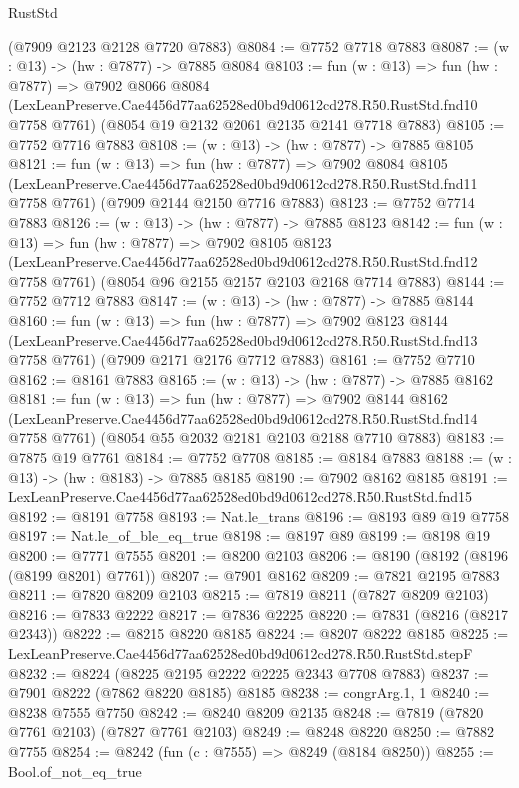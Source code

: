 \begin{lexlean}{RustStd}
\begin{coremodule}
    (@7909 @2123 @2128 @7720 @7883)
@8084 := @7752 @7718 @7883
@8087 := (w : @13) -> (hw : @7877) -> @7885 @8084
@8103 := fun (w : @13) =>
  fun (hw : @7877) =>
  @7902
    @8066
    @8084
    (LexLeanPreserve.Cae4456d77aa62528ed0bd9d0612cd278.R50.RustStd.fnd10 @7758 @7761)
    (@8054 @19 @2132 @2061 @2135 @2141 @7718 @7883)
@8105 := @7752 @7716 @7883
@8108 := (w : @13) -> (hw : @7877) -> @7885 @8105
@8121 := fun (w : @13) =>
  fun (hw : @7877) =>
  @7902
    @8084
    @8105
    (LexLeanPreserve.Cae4456d77aa62528ed0bd9d0612cd278.R50.RustStd.fnd11 @7758 @7761)
    (@7909 @2144 @2150 @7716 @7883)
@8123 := @7752 @7714 @7883
@8126 := (w : @13) -> (hw : @7877) -> @7885 @8123
@8142 := fun (w : @13) =>
  fun (hw : @7877) =>
  @7902
    @8105
    @8123
    (LexLeanPreserve.Cae4456d77aa62528ed0bd9d0612cd278.R50.RustStd.fnd12 @7758 @7761)
    (@8054 @96 @2155 @2157 @2103 @2168 @7714 @7883)
@8144 := @7752 @7712 @7883
@8147 := (w : @13) -> (hw : @7877) -> @7885 @8144
@8160 := fun (w : @13) =>
  fun (hw : @7877) =>
  @7902
    @8123
    @8144
    (LexLeanPreserve.Cae4456d77aa62528ed0bd9d0612cd278.R50.RustStd.fnd13 @7758 @7761)
    (@7909 @2171 @2176 @7712 @7883)
@8161 := @7752 @7710
@8162 := @8161 @7883
@8165 := (w : @13) -> (hw : @7877) -> @7885 @8162
@8181 := fun (w : @13) =>
  fun (hw : @7877) =>
  @7902
    @8144
    @8162
    (LexLeanPreserve.Cae4456d77aa62528ed0bd9d0612cd278.R50.RustStd.fnd14 @7758 @7761)
    (@8054 @55 @2032 @2181 @2103 @2188 @7710 @7883)
@8183 := @7875 @19 @7761
@8184 := @7752 @7708
@8185 := @8184 @7883
@8188 := (w : @13) -> (hw : @8183) -> @7885 @8185
@8190 := @7902 @8162 @8185
@8191 := LexLeanPreserve.Cae4456d77aa62528ed0bd9d0612cd278.R50.RustStd.fnd15
@8192 := @8191 @7758
@8193 := Nat.le_trans
@8196 := @8193 @89 @19 @7758
@8197 := Nat.le_of_ble_eq_true
@8198 := @8197 @89
@8199 := @8198 @19
@8200 := @7771 @7555
@8201 := @8200 @2103
@8206 := @8190 (@8192 (@8196 (@8199 @8201) @7761))
@8207 := @7901 @8162
@8209 := @7821 @2195 @7883
@8211 := @7820 @8209 @2103
@8215 := @7819 @8211 (@7827 @8209 @2103)
@8216 := @7833 @2222
@8217 := @7836 @2225
@8220 := @7831 (@8216 (@8217 @2343))
@8222 := @8215 @8220 @8185
@8224 := @8207 @8222 @8185
@8225 := LexLeanPreserve.Cae4456d77aa62528ed0bd9d0612cd278.R50.RustStd.stepF
@8232 := @8224 (@8225 @2195 @2222 @2225 @2343 @7708 @7883)
@8237 := @7901 @8222 (@7862 @8220 @8185) @8185
@8238 := congrArg.{1, 1}
@8240 := @8238 @7555 @7750
@8242 := @8240 @8209 @2135
@8248 := @7819 (@7820 @7761 @2103) (@7827 @7761 @2103)
@8249 := @8248 @8220
@8250 := @7882 @7755
@8254 := @8242 (fun (c : @7555) => @8249 (@8184 @8250))
@8255 := Bool.of_not_eq_true

\end{coremodule}
\end{lexlean}
